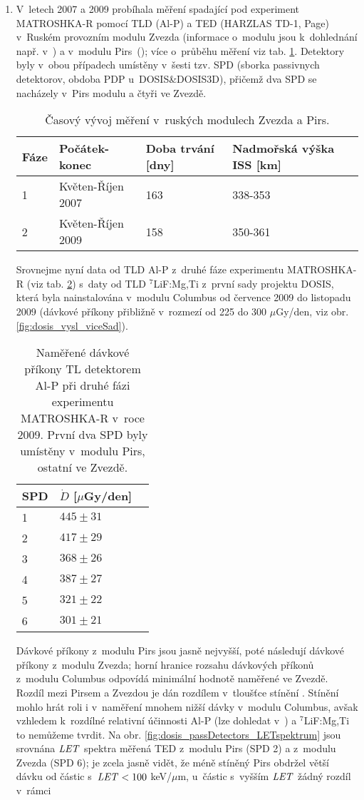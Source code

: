 \begin{enumerate}
\item V~letech 2007 a 2009 probíhala měření spadající pod experiment MATROSHKA-R pomocí TLD (Al-P) a TED (HARZLAS TD-1, Page) v~Ruském provozním modulu Zvezda (informace o~modulu jsou k~dohlednání např. v~\cite{serviceModule}) a v~modulu Pirs~(\cite{piers1}); více o~průběhu měření viz tab. \ref{tab:dosis_passDetectors_timeline}. Detektory byly v~obou případech umístěny v~šesti tzv. SPD (sborka passivnych detektorov, obdoba PDP u~DOSIS\&DOSIS3D), přičemž dva SPD se nacházely v~Pirs modulu a čtyři ve Zvezdě. 
\begin{table}[h]
  \centering
  \caption{Časový vývoj měření v~ruských modulech Zvezda a Pirs. \cite{passDetectors}}
  \label{tab:dosis_passDetectors_timeline}
  \begin{tabular}{llll}
	\toprule
	Fáze&Počátek-konec&Doba trvání [dny]&Nadmořská výška ISS [km]\\
	\midrule
	1&Květen-Říjen 2007&163&338-353\\
	2&Květen-Říjen 2009&158&350-361\\
	\bottomrule
  \end{tabular}
\end{table}
Srovnejme nyní data od TLD Al-P z~druhé fáze experimentu MATROSHKA-R (viz tab. \ref{tab:dosis_passDetectors_vysledky}) s~daty od TLD $^7$LiF:Mg,Ti z~první sady projektu DOSIS, která byla nainstalována v~modulu Columbus od července 2009 do listopadu 2009 (dávkové příkony přibližně v~rozmezí od 225 do 300 $\mu$Gy/den, viz obr. \ref{fig:dosis_vysl_viceSad}). 
\begin{table}[h]
  \centering
  \caption{Naměřené dávkové příkony TL detektorem Al-P při druhé fázi experimentu MATROSHKA-R v~roce 2009. První dva SPD byly umístěny v~modulu Pirs, ostatní ve Zvezdě. \cite{passDetectors}}
  \label{tab:dosis_passDetectors_vysledky}
  \begin{tabular}{lll}
	\toprule
	SPD&$\dot{D}$ [$\mu$Gy/den]\\
	\midrule
	1&$445\pm31$\\
	2&$417\pm29$\\
	3&$368\pm26$\\
	4&$387\pm27$\\
	5&$321\pm22$\\
	6&$301\pm21$\\
	\bottomrule
  \end{tabular}
\end{table}
Dávkové příkony z~modulu Pirs jsou jasně nejvyšší, poté následují dávkové příkony z~modulu Zvezda; horní hranice rozsahu dávkových příkonů z~modulu Columbus odpovídá minimální hodnotě naměřené ve Zvezdě. Rozdíl mezi Pirsem a Zvezdou je dán rozdílem v~tloušťce stínění \cite{passDetectors}. Stínění mohlo hrát roli i v~naměření mnohem nižší dávky v~modulu Columbus, avšak vzhledem k~rozdílné relativní účinnosti Al-P (lze dohledat v~\cite{dataTLD_RR}) a $^7$LiF:Mg,Ti to nemůžeme tvrdit. Na obr. \ref{fig:dosis_passDetectors_LETspektrum} jsou srovnána $\mathit{LET}$ spektra měřená TED z~modulu Pirs (SPD 2) a z~modulu Zvezda (SPD 6); je zcela jasně vidět, že méně stíněný Pirs obdržel větší dávku od částic s~$\mathit{LET}<100$ keV/$\mu$m, u~částic s~vyšším $\mathit{LET}$ žádný rozdíl v~rámci

\end{enumerate}
